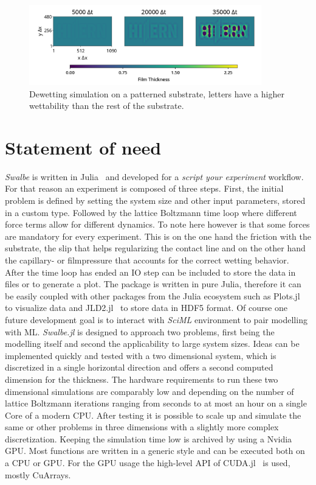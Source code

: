 \begin{figure}
    \centering
    \includegraphics[width = 0.9\textwidth]{graphics/Hiern_logo.png}
    \caption{Dewetting simulation on a patterned substrate, letters have a higher wettability than the rest of the substrate.}
    \label{fig:logo}
\end{figure}

\section{Statement of need}
\label{sec:Joss_need}
\textit{Swalbe} is written in Julia~\cite{bezansonJuliaFreshApproach2017} and developed for a \textit{script your experiment} workflow.
For that reason an experiment is composed of three steps.
First, the initial problem is defined by setting the system size and other input parameters, stored in a custom type.
Followed by the lattice Boltzmann time loop where different force terms allow for different dynamics.
To note here however is that some forces are mandatory for every experiment.
This is on the one hand the friction with the substrate, the slip that helps regularizing the contact line and on the other hand the capillary- or filmpressure that accounts for the correct wetting behavior.  
After the time loop has ended an IO step can be included to store the data in files or to generate a plot.
The package is written in pure Julia, therefore it can be easily coupled with other packages from the Julia ecosystem such as Plots.jl~\cite{breloffPlotsJl2021} to visualize data and JLD2.jl~\cite{JLD22022} to store data in HDF5 format.
Of course one future development goal is to interact with \textit{SciML} environment to pair modelling with ML.  
\textit{Swalbe.jl} is designed to approach two problems, first being the modelling itself and second the applicability to large system sizes.
Ideas can be implemented quickly and tested with a two dimensional system, which is discretized in a single horizontal direction and offers a second computed dimension for the thickness.
The hardware requirements to run these two dimensional simulations are comparably low and depending on the number of lattice Boltzmann iterations ranging from seconds to at most an hour on a single Core of a modern CPU.
After testing it is possible to scale up and simulate the same or other problems in three dimensions with a slightly more complex discretization.
Keeping the simulation time low is archived by using a Nvidia GPU.
Most functions are written in a generic style and can be executed both on a CPU or GPU.
For the GPU usage the high-level API of CUDA.jl~\cite{besardEffectiveExtensibleProgramming2019, besardRapidSoftwarePrototyping2019} is used, mostly CuArrays.

